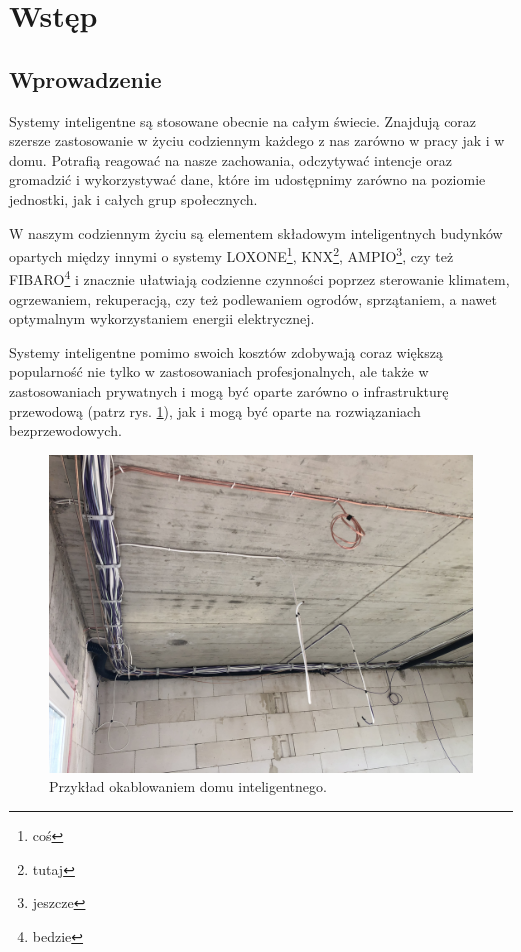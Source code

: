 \documentclass[a4paper,12pt,reqno]{article}
\begin{document}
\newpage

%
%
\section{Wstęp} \label{section:wstep}

\subsection{Wprowadzenie}

Systemy inteligentne są stosowane obecnie na całym świecie. Znajdują coraz szersze zastosowanie w życiu codziennym każdego z nas zarówno w pracy jak i w domu. Potrafią reagować na nasze zachowania, odczytywać intencje oraz gromadzić i wykorzystywać dane, które im udostępnimy zarówno na poziomie jednostki, jak i całych grup społecznych.

W naszym codziennym życiu są elementem składowym inteligentnych budynków opartych między innymi o systemy LOXONE\footnote{coś}, KNX\footnote{tutaj}, AMPIO\footnote{jeszcze}, czy też FIBARO\footnote{bedzie} i znacznie ułatwiają codzienne czynności poprzez sterowanie klimatem, ogrzewaniem, rekuperacją, czy też podlewaniem ogrodów, sprzątaniem, a nawet optymalnym wykorzystaniem energii elektrycznej.

Systemy inteligentne pomimo swoich kosztów zdobywają coraz większą popularność nie tylko w zastosowaniach profesjonalnych, ale także w zastosowaniach prywatnych i mogą być oparte zarówno o infrastrukturę przewodową (patrz rys. \ref{kable}), jak i mogą być oparte na rozwiązaniach bezprzewodowych.

\begin{figure}[H]%
\centering
\includegraphics[width=0.8\columnwidth]{imgs/domkable.jpg}
\caption{Przykład okablowaniem domu inteligentnego. \label{kable}}
\quad
\end{figure}
\end{document}
